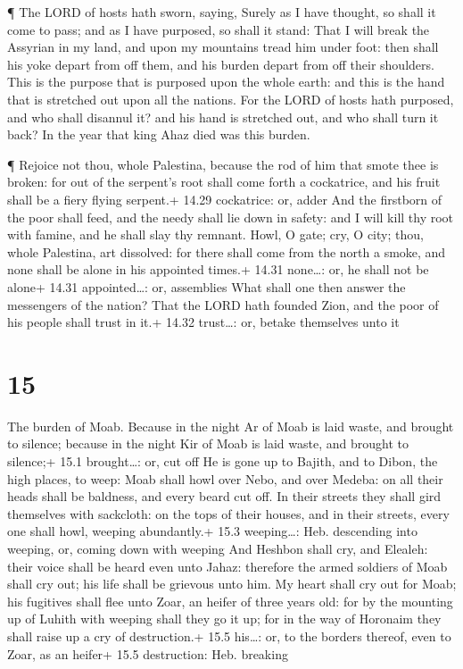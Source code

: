  ¶ The LORD of hosts hath sworn, saying, Surely as I have
thought, so shall it come to pass; and as I have purposed, so shall it
stand:  That I will break the Assyrian in my land, and upon
my mountains tread him under foot: then shall his yoke depart from off
them, and his burden depart from off their shoulders.  This
is the purpose that is purposed upon the whole earth: and this is the
hand that is stretched out upon all the nations.  For the
LORD of hosts hath purposed, and who shall disannul it? and his hand is
stretched out, and who shall turn it back?  In the year
that king Ahaz died was this burden.

 ¶ Rejoice not thou, whole Palestina, because the rod of
him that smote thee is broken: for out of the serpent's root shall come
forth a cockatrice, and his fruit shall be a fiery flying serpent.+
14.29 cockatrice: or, adder  And the firstborn of the poor
shall feed, and the needy shall lie down in safety: and I will kill thy
root with famine, and he shall slay thy remnant.  Howl, O
gate; cry, O city; thou, whole Palestina, art dissolved: for there shall
come from the north a smoke, and none shall be alone in his appointed
times.+ 14.31 none\ldots: or, he shall not be alone+ 14.31
appointed\ldots: or, assemblies  What shall one then answer
the messengers of the nation? That the LORD hath founded Zion, and the
poor of his people shall trust in it.+ 14.32 trust\ldots: or, betake
themselves unto it

\hypertarget{section-14}{%
\section{15}\label{section-14}}

 The burden of Moab. Because in the night Ar of Moab is laid
waste, and brought to silence; because in the night Kir of Moab is laid
waste, and brought to silence;+ 15.1 brought\ldots: or, cut off
 He is gone up to Bajith, and to Dibon, the high places, to
weep: Moab shall howl over Nebo, and over Medeba: on all their heads
shall be baldness, and every beard cut off.  In their
streets they shall gird themselves with sackcloth: on the tops of their
houses, and in their streets, every one shall howl, weeping abundantly.+
15.3 weeping\ldots: Heb. descending into weeping, or, coming down with
weeping  And Heshbon shall cry, and Elealeh: their voice
shall be heard even unto Jahaz: therefore the armed soldiers of Moab
shall cry out; his life shall be grievous unto him.  My
heart shall cry out for Moab; his fugitives shall flee unto Zoar, an
heifer of three years old: for by the mounting up of Luhith with weeping
shall they go it up; for in the way of Horonaim they shall raise up a
cry of destruction.+ 15.5 his\ldots: or, to the borders thereof, even to
Zoar, as an heifer+ 15.5 destruction: Heb. breaking

